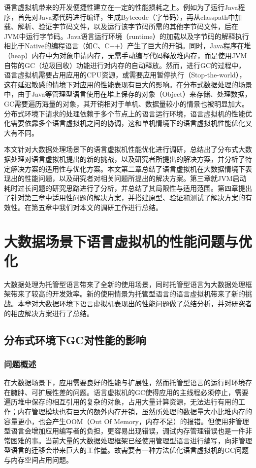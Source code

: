 \documentclass[lang=cn,12pt,a4paper,cite=authoryear]{elegantpaper}
\begin{document}
语言虚拟机带来的开发便捷性建立在一定的性能损耗之上。例如为了运行Java程序，首先对Java源代码进行编译，生成Bytecode（字节码），再从classpath中加载、解析、验证字节码文件，以及运行该字节码所需的其他字节码文件，后在JVM中运行字节码。Java语言运行环境（runtime）的加载以及字节码的解释执行相比于Native的编程语言（如C、C++）产生了巨大的开销。同时，Java程序在堆（heap）内存中为对象申请内存，无需手动编写代码释放堆内存，而是使用JVM自带的GC（垃圾回收）功能进行对内存的自动释放。然而，进行GC的过程中，语言虚拟机需要占用应用的CPU资源，或需要应用暂停执行（Stop-the-world），这在延迟敏感的情境下对应用的性能表现有巨大的影响。在分布式数据处理的场景中，由于Java等管理型语言使用在堆上保存的对象（Object）来存储、处理数据，GC需要遍历海量的对象，其开销相对于单机、数据量较小的情景也被明显加大。分布式环境下请求的处理依赖于多个节点上的语言运行环境，语言虚拟机的性能优化需要依靠多个语言虚拟机之间的协调，这和单机情境下的语言虚拟机性能优化又大有不同。

本文针对大数据处理场景下的语言虚拟机性能优化进行调研，总结出了分布式大数据处理对语言虚拟机提出的新的挑战，以及研究者所提出的解决方案，并分析了特定解决方案的适用性与优化方案。本文第二章总结了语言虚拟机在大数据情境下表现出的性能问题，以及研究者对相关问题所提出的解决方案。第三章就JVM启动耗时过长问题的研究思路进行了分析，并总结了其局限性与适用范围。第四章提出了针对第三章中适用性问题的解决方案，并搭建原型、验证和测试了解决方案的有效性。在第五章中我们对本文的调研工作进行总结。

\section{大数据场景下语言虚拟机的性能问题与优化}
大数据处理为托管型语言带来了全新的使用场景，同时托管型语言为大数据处理框架带来了较高的开发效率。新的使用情景为托管型语言的语言虚拟机带来了新的挑战。本章对大数据环境下语言虚拟机表现出的性能问题做了总结分析，并对研究者的相应解决方案进行了总结。

\subsection{分布式环境下GC对性能的影响}
\subsubsection{问题概述}
在大数据场景下，应用需要良好的性能与扩展性，然而托管型语言的运行时环境存在臃肿、可扩展性差的问题。语言虚拟机的GC使得应用的主线程必须停止，需要遍历堆中保存的相互引用的复杂的对象，占用大量计算资源，无法进行有用的工作；内存管理模块也有巨大的额外内存开销，虽然所处理的数据量大小比堆内存的容量更小，也会产生OOM（Out Of Memory，内存不足）的报错。但使用非管理型语言会增加应用编写者的负担，更容易出现错误，调试内存管理错误也是一件非常困难的事。当前大量的大数据处理框架已经使用管理型语言进行编写，向非管理型语言的迁移会带来巨大的工作量。故需要有一种方法优化语言虚拟机的GC问题与内存空间占用问题。
\end{document}
